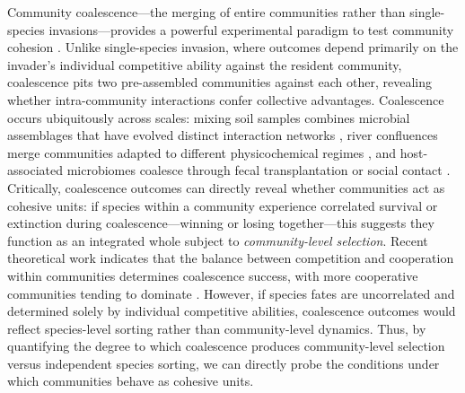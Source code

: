 Community coalescence---the merging of entire communities rather than single-species invasions---provides a powerful experimental paradigm to test community cohesion \citep{Rillig2015, Castledine2020}. Unlike single-species invasion, where outcomes depend primarily on the invader's individual competitive ability against the resident community, coalescence pits two pre-assembled communities against each other, revealing whether intra-community interactions confer collective advantages. Coalescence occurs ubiquitously across scales: mixing soil samples combines microbial assemblages that have evolved distinct interaction networks \citep{Liu2024, Calderon2023}, river confluences merge communities adapted to different physicochemical regimes \citep{Rocca2020}, and host-associated microbiomes coalesce through fecal transplantation or social contact \citep{Xiao2020}. Critically, coalescence outcomes can directly reveal whether communities act as cohesive units: if species within a community experience correlated survival or extinction during coalescence---winning or losing together---this suggests they function as an integrated whole subject to \textit{community-level selection}. Recent theoretical work indicates that the balance between competition and cooperation within communities determines coalescence success, with more cooperative communities tending to dominate \citep{Lechon2021}. However, if species fates are uncorrelated and determined solely by individual competitive abilities, coalescence outcomes would reflect species-level sorting rather than community-level dynamics. Thus, by quantifying the degree to which coalescence produces community-level selection versus independent species sorting, we can directly probe the conditions under which communities behave as cohesive units.

